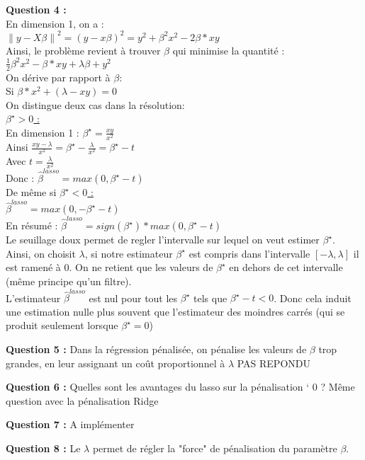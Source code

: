 \documentclass{article}
\newcommand{\norm}[1]{\left\lVert#1\right\rVert^{2}}
\begin{document}
\textbf{Question 4 :}
\\En dimension 1, on a :
\\$\norm{y-X\beta} = (y-x\beta)^2 = y^2 + \beta^2x^2 - 2\beta*xy $
\\Ainsi, le problème revient à trouver $\beta$ qui minimise la quantité :
\\$ \frac{1}{2}\beta^2x^2 -\beta*xy +  \lambda\beta + y^2 $
\\On dérive par rapport à $\beta$:
\\Si $\beta*x^2 + (\lambda - xy) = 0$
\\On distingue deux cas dans la résolution: 
\\\underline{$\beta^{\star}>0$ :}
\\En dimension 1 : $\beta^{\star} = \frac{xy}{x^2}$
\\Ainsi $\frac{xy - \lambda}{x^2} = \beta^{\star} - \frac{\lambda}{x^2} = \beta^{\star} - t  $
\\Avec $t = \frac{\lambda}{x^2}$
\\Donc : $\hat{\beta}^{lasso}= max(0,\beta^{\star} - t)$
\\De même si \underline{$\beta^{\star}<0$ :}
\\$\hat{\beta}^{lasso}= max(0,-\beta^{\star} - t)$
\\En résumé : $\hat{\beta}^{lasso}= sign(\beta^{\star})*max(0,\beta^{\star} - t)$
\\Le seuillage doux permet de regler l'intervalle sur lequel on veut estimer $\beta^{\star}$. Ainsi, on choisit $\lambda$, si notre estimateur $\beta^{\star}$ est compris dans l'intervalle $[-\lambda,\lambda]$ il est ramené à 0. On ne retient que les valeurs de $\beta^{\star}$ en dehors de cet intervalle (même principe qu'un filtre).
\\L'estimateur $\hat{\beta}^{lasso}$ est nul pour tout les $\beta^{\star}$ tels que $\beta^{\star} - t < 0$. Donc cela induit une estimation nulle plus souvent que l'estimateur des moindres carrés (qui se produit seulement lorsque $\beta^{\star} = 0$)

\textbf{Question 5 :}
Dans la régression pénalisée, on pénalise les valeurs de $\beta$ trop grandes, en leur assignant un coût proportionnel à $\lambda$
PAS REPONDU

\textbf{Question 6 :}
Quelles sont les avantages du lasso sur la pénalisation ` 0 ?
Même question avec la pénalisation Ridge

\textbf{Question 7 :}
A implémenter


\textbf{Question 8 :}
Le $\lambda$ permet de régler la "force" de pénalisation du paramètre $\beta$.
\end{document}
